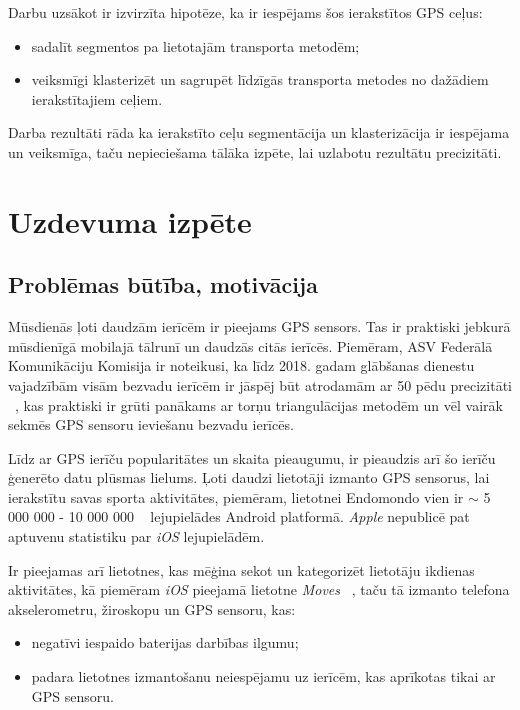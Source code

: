 \documentclass{ludis}
\begin{document}
Darbu uzsākot ir izvirzīta hipotēze, ka ir iespējams šos ierakstītos GPS ceļus:
\begin{itemize}
\item sadalīt segmentos pa lietotajām transporta metodēm;
\item veiksmīgi klasterizēt un sagrupēt līdzīgās transporta metodes no dažā\-diem ierakstītajiem ceļiem.
\end{itemize}


Darba rezultāti rāda ka ierakstīto ceļu segmentācija un klasterizācija ir iespējama un veiksmīga,
taču nepieciešama tālāka izpēte, lai uzlabotu rezultātu precizitāti.

\chapter{Uzdevuma izpēte}
\section{Problēmas būtība, motivācija}
Mūsdienās ļoti daudzām ierīcēm ir pieejams GPS sensors. Tas ir praktiski jebkurā mūsdienīgā mobilajā
tālrunī un daudzās citās ierīcēs. Piemēram, ASV Federālā Komunikāciju Komisija ir noteikusi, ka līdz
2018. gadam glāb\-šanas dienestu vajadzībām visām bezvadu ierīcēm ir jāspēj būt atrodamām 
ar 50 pēdu precizitāti ~\cite{fcc_e911}, kas praktiski ir grūti panākams ar torņu trian\-gulācijas 
metodēm un vēl vairāk sekmēs GPS sensoru ieviešanu bezvadu ierīcēs.

Līdz ar GPS ierīču popularitātes un skaita pieaugumu, ir pieaudzis arī šo ierīču ģenerēto datu
plūsmas lielums. Ļoti daudzi lietotāji izmanto GPS sensorus, lai ierakstītu savas sporta aktivitātes,
piemēram, lietotnei Endo\-mondo vien ir $\sim$ 5 000 000 - 10 000 000 ~\cite{g_play_endomondo} 
lejupielādes Android platformā. \emph{Apple} nepublicē pat aptuvenu statistiku par \emph{iOS}
lejupielādēm.

Ir pieejamas arī lietotnes, kas mēģina sekot un kategorizēt lietotāju \linebreak ikdienas 
aktivitātes, kā piemēram \emph{iOS} pieejamā lietotne \emph{Moves} ~\cite{moves_app}, taču tā 
izmanto telefona akselerometru, žiroskopu un GPS sensoru, kas:
\begin{itemize}
\item negatīvi iespaido baterijas darbības ilgumu;
\item padara lietotnes izmantošanu neiespējamu uz ierīcēm, kas aprīkotas tikai ar GPS sensoru.
\end{itemize}
\end{document}
